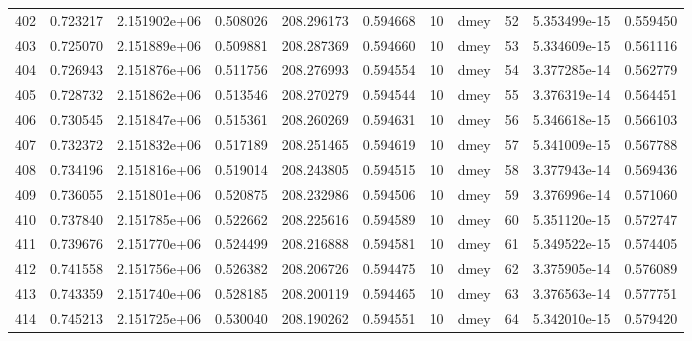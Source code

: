 \begin{tabular}{lrrrrrrlrrr}
402  &    0.723217 &        2.151902e+06 &  0.508026 &              208.296173 &    0.594668 &      10 &         dmey &     52 &   5.353499e-15 &      0.559450 \\
403  &    0.725070 &        2.151889e+06 &  0.509881 &              208.287369 &    0.594660 &      10 &         dmey &     53 &   5.334609e-15 &      0.561116 \\
404  &    0.726943 &        2.151876e+06 &  0.511756 &              208.276993 &    0.594554 &      10 &         dmey &     54 &   3.377285e-14 &      0.562779 \\
405  &    0.728732 &        2.151862e+06 &  0.513546 &              208.270279 &    0.594544 &      10 &         dmey &     55 &   3.376319e-14 &      0.564451 \\
406  &    0.730545 &        2.151847e+06 &  0.515361 &              208.260269 &    0.594631 &      10 &         dmey &     56 &   5.346618e-15 &      0.566103 \\
407  &    0.732372 &        2.151832e+06 &  0.517189 &              208.251465 &    0.594619 &      10 &         dmey &     57 &   5.341009e-15 &      0.567788 \\
408  &    0.734196 &        2.151816e+06 &  0.519014 &              208.243805 &    0.594515 &      10 &         dmey &     58 &   3.377943e-14 &      0.569436 \\
409  &    0.736055 &        2.151801e+06 &  0.520875 &              208.232986 &    0.594506 &      10 &         dmey &     59 &   3.376996e-14 &      0.571060 \\
410  &    0.737840 &        2.151785e+06 &  0.522662 &              208.225616 &    0.594589 &      10 &         dmey &     60 &   5.351120e-15 &      0.572747 \\
411  &    0.739676 &        2.151770e+06 &  0.524499 &              208.216888 &    0.594581 &      10 &         dmey &     61 &   5.349522e-15 &      0.574405 \\
412  &    0.741558 &        2.151756e+06 &  0.526382 &              208.206726 &    0.594475 &      10 &         dmey &     62 &   3.375905e-14 &      0.576089 \\
413  &    0.743359 &        2.151740e+06 &  0.528185 &              208.200119 &    0.594465 &      10 &         dmey &     63 &   3.376563e-14 &      0.577751 \\
414  &    0.745213 &        2.151725e+06 &  0.530040 &              208.190262 &    0.594551 &      10 &         dmey &     64 &   5.342010e-15 &      0.579420 \\

\end{tabular}
